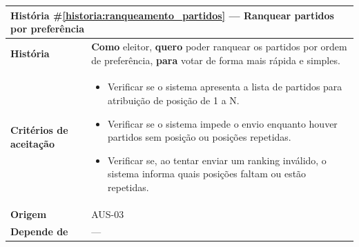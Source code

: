 \documentclass[12pt,a4paper]{article}
\newcounter{historia}
\begin{document}
\label{historia:ranqueamento_partidos}
\begin{table}[H]
    \centering
    \begin{tabular}{|m{4.5cm} | m{11cm}|}
    \hline
    
    \multicolumn{2}{|l|}{\textbf{História \#\ref{historia:ranqueamento_partidos} --- Ranquear partidos por preferência}} \\
    
    \hline  \textbf{História} &
    \textbf{Como} eleitor, \newline
    \textbf{quero} poder ranquear os partidos por ordem de preferência, \newline  
    \textbf{para} votar de forma mais rápida e simples. \\
    
    \textbf{Critérios de aceitação} &
    \begin{itemize}
        \item{Verificar se o sistema apresenta a lista de partidos para atribuição de posição de 1 a N.}
        \item{Verificar se o sistema impede o envio enquanto houver partidos sem posição ou posições repetidas.}
        \item{Verificar se, ao tentar enviar um ranking inválido, o sistema informa quais posições faltam ou estão repetidas.}
    \end{itemize}\\
    
    
    \textbf{Origem} &
    AUS-03 \\
    
    \textbf{Depende de} &
    --- \\
    
    \hline
    \end{tabular}
\end{table}
\end{document}
